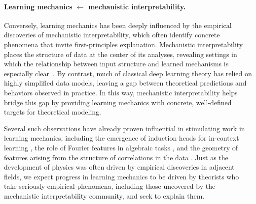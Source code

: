 \paragraph{Learning mechanics $\leftarrow$ mechanistic interpretability.}
Conversely, learning mechanics has been deeply influenced by the empirical discoveries of mechanistic interpretability, which often identify concrete phenomena that invite first-principles explanation.
Mechanistic interpretability places the structure of data at the center of its analyses, revealing settings in which the relationship between input structure and learned mechanisms is especially clear~\citep{nanda2023progress, shai2024transformers}.
By contrast, much of classical deep learning theory has relied on highly simplified data models, leaving a gap between theoretical predictions and behaviors observed in practice.
In this way, mechanistic interpretability helps bridge this gap by providing learning mechanics with concrete, well-defined targets for theoretical modeling.

Several such observations have already proven influential in stimulating work in learning mechanics, including the emergence of induction heads for in-context learning \citep{bietti2023birth, reddy2023mechanistic,nichani2024transformers}, the role of Fourier features in algebraic tasks \citep{morwani2023feature,kunin2025alternating,marchetti2026sequential}, and the geometry of features arising from the structure of correlations in the data \citep{engels2024not, prieto2025correlations, karkada2026symmetry}.
Just as the development of physics was often driven by empirical discoveries in adjacent fields, we expect progress in learning mechanics to be driven by theorists who take seriously empirical phenomena, including those uncovered by the mechanistic interpretability community, and seek to explain them.
